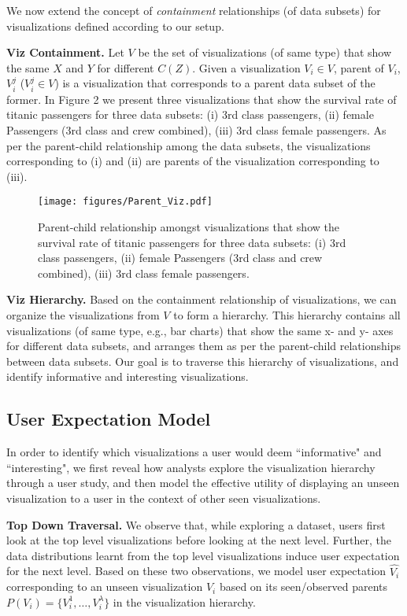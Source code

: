We now extend the concept of \emph{containment} relationships (of data subsets) for visualizations defined according to our setup. 

\textbf{Viz Containment.} Let $V$ be the set of visualizations (of same type) that show the same $X$ and $Y$ for different $C(Z)$. Given a visualization $V_i \in V$, parent of $V_i$, $V_i^j$ ($V_i^j\in V$) is a visualization that corresponds to a parent data subset of the former. In Figure 2 we present three visualizations that show the survival rate of titanic passengers for three data subsets: (i) 3rd class passengers, (ii) female Passengers (3rd class and crew combined), (iii) 3rd class female passengers. As per the parent-child relationship among the data subsets, the visualizations corresponding to (i) and (ii) are parents of the visualization corresponding to (iii). %

\begin{figure}[bht]
\label{example}
\centering
\texttt{[image: figures/Parent\_Viz.pdf]}
\caption{Parent-child relationship amongst visualizations that show the survival rate of titanic passengers for three data subsets: (i) 3rd class passengers, (ii) female Passengers (3rd class and crew combined), (iii) 3rd class female passengers.}
\end{figure}

\textbf{Viz Hierarchy.} Based on the containment relationship of visualizations, we can organize the visualizations from $V$ to form a hierarchy. This hierarchy contains all visualizations (of same type, e.g., bar charts) that show the same x- and y- axes for different data subsets, and arranges them as per the parent-child relationships between data subsets. Our goal is to traverse this hierarchy of visualizations, and identify informative and interesting visualizations.

\subsection{User Expectation Model}
In order to identify which visualizations a user would deem ``informative" and ``interesting", we first reveal how analysts explore the visualization hierarchy through a user study, and then model the effective utility of displaying an unseen visualization to a user in the context of other seen visualizations. 
 
\textbf{Top Down Traversal.} We observe that, while exploring a dataset, users first look at the top level visualizations before looking at the next level. Further, the data distributions learnt from the top level visualizations induce user expectation for the next level. Based on these two observations, we model user expectation $\hat{V_i}$ corresponding to an unseen visualization $V_i$ based on its seen/observed parents $P(V_i) = \{V_i^1, \ldots, V_i^\lambda\}$ in the visualization hierarchy. 

